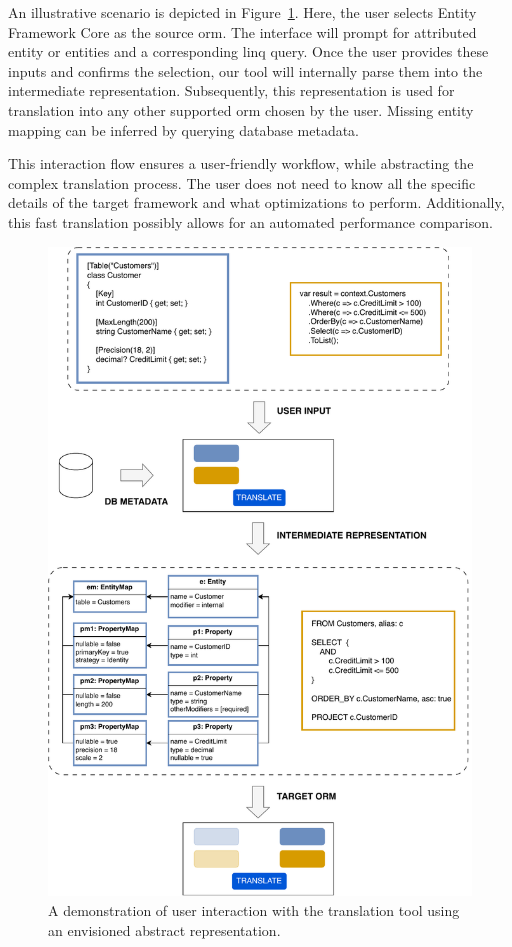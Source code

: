 An illustrative scenario is depicted in Figure~\ref{fig:orm_to_abstract}. Here, the user selects Entity Framework Core as the source \acrshort{orm}. The interface will prompt for attributed entity or entities and a corresponding \acrshort{linq} query. Once the user provides these inputs and confirms the selection, our tool will internally parse them into the intermediate representation. Subsequently, this representation is used for translation into any other supported \acrshort{orm} chosen by the user. Missing entity mapping can be inferred by querying database metadata.

This interaction flow ensures a user-friendly workflow, while abstracting the complex translation process. The user does not need to know all the specific details of the target framework and what optimizations to perform. Additionally, this fast translation possibly allows for an automated performance comparison.

\begin{figure}[p]
  \centering
  \includegraphics[width=\textwidth]{thesis/img/thesis/02_user_interaction.drawio.pdf}
  \caption{A demonstration of user interaction with the translation tool using an envisioned abstract representation.}
  \label{fig:orm_to_abstract}
\end{figure}

